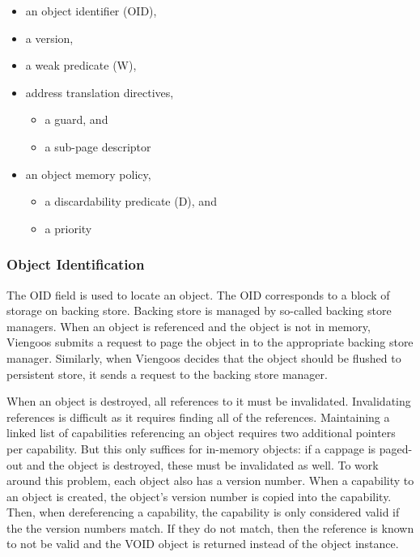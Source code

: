 \begin{itemize}
\item an object identifier (OID),
\item a version,
\item a weak predicate (W),
\item address translation directives,
  \begin{itemize}
  \item a guard, and
  \item a sub-page descriptor
  \end{itemize}
\item an object memory policy,
  \begin{itemize}
  \item a discardability predicate (D), and
  \item a priority
  \end{itemize}
\end{itemize}

\subsubsection{Object Identification}

The OID field is used to locate an object.  The OID corresponds to a
block of storage on backing store.  Backing store is managed by
so-called backing store managers.  When an object is referenced and
the object is not in memory, Viengoos submits a request to page the
object in to the appropriate backing store manager.  Similarly, when
Viengoos decides that the object should be flushed to persistent
store, it sends a request to the backing store manager.

When an object is destroyed, all references to it must be invalidated.
Invalidating references is difficult as it requires finding all of the
references.  Maintaining a linked list of capabilities referencing an
object requires two additional pointers per capability.  But this only
suffices for in-memory objects: if a cappage is paged-out and the
object is destroyed, these must be invalidated as well.  To work
around this problem, each object also has a version number.  When a
capability to an object is created, the object's version number is
copied into the capability.  Then, when dereferencing a capability,
the capability is only considered valid if the the version numbers
match.  If they do not match, then the reference is known to not be
valid and the VOID object is returned instead of the object instance.

